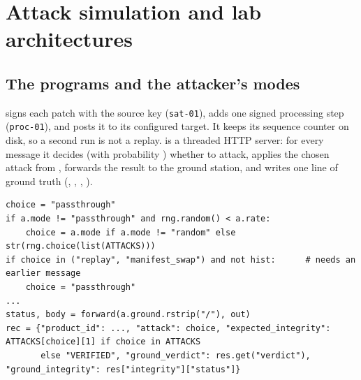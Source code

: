 \section{Attack simulation and lab architectures}\label{sec:labs}

\subsection{The programs and the attacker's modes}
 signs each patch with the source key (\texttt{sat-01}), adds one signed processing step (\texttt{proc-01}), and posts it to its configured target. It keeps its sequence counter on disk, so a second run is not a replay.  is a threaded HTTP server: for every message it decides (with probability ) whether to attack, applies the chosen attack from , forwards the result to the ground station, and writes one line of ground truth (, , , ).
\begin{lstlisting}[style=py]
choice = "passthrough"
if a.mode != "passthrough" and rng.random() < a.rate:
    choice = a.mode if a.mode != "random" else str(rng.choice(list(ATTACKS)))
if choice in ("replay", "manifest_swap") and not hist:      # needs an earlier message
    choice = "passthrough"
...
status, body = forward(a.ground.rstrip("/"), out)
rec = {"product_id": ..., "attack": choice, "expected_integrity": ATTACKS[choice][1] if choice in ATTACKS
       else "VERIFIED", "ground_verdict": res.get("verdict"), "ground_integrity": res["integrity"]["status"]}
\end{lstlisting}

